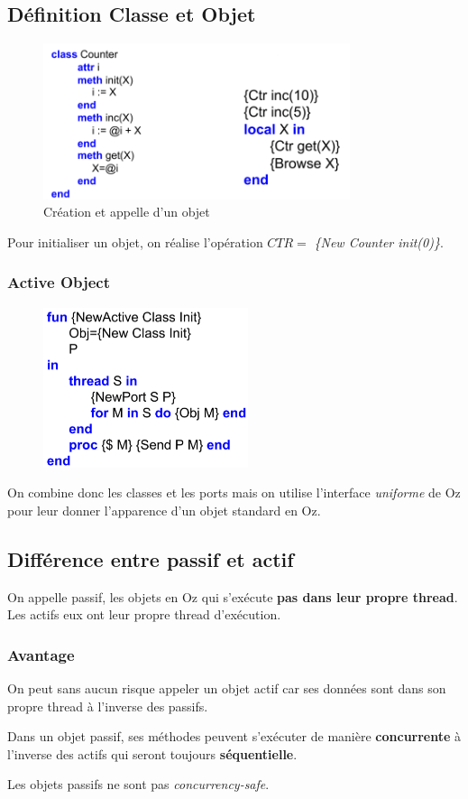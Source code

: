 \documentclass{report}
\begin{document}
\subsection{Définition Classe et Objet}
\begin{figure}[H]
\centering
\includegraphics[width=9cm]{img/objet.png}
\caption{Création et appelle d'un objet}
\end{figure}
Pour initialiser un objet, on réalise l'opération $CTR=$ \textit{\{New Counter init(0)\}}.

\subsubsection{Active Object}
\begin{figure}
\centering
\includegraphics[width=6cm]{img/activeObj.png}
\end{figure}
On combine donc les classes et les ports mais on utilise l'interface \textit{uniforme} de Oz pour leur donner l'apparence d'un objet standard en Oz.

\subsection{Différence entre passif et actif}
On appelle passif, les objets en Oz qui s'exécute \textbf{pas dans leur propre thread}. Les actifs eux ont leur propre thread d'exécution.

\subsubsection{Avantage}
On peut sans aucun risque appeler un objet actif car ses données sont dans son propre thread à l'inverse des passifs. \par 
Dans un objet passif, ses méthodes peuvent s'exécuter de manière \textbf{concurrente} à l'inverse des actifs qui seront toujours \textbf{séquentielle}.\par 
Les objets passifs ne sont pas \textit{concurrency-safe}.
\end{document}

